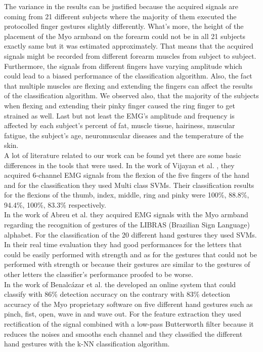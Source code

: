 The variance in the results can be justified because the acquired signals are coming from 21 different subjects where the majority of them executed the protocolled finger gestures slightly differently. What's more, the height of the placement of the Myo armband on the forearm could not be in all 21 subjects exactly same but it was estimated approximately. That means that the acquired signals might be recorded from different forearm muscles from subject to subject.  Furthermore, the signals from different fingers have varying amplitude which could lead to a biased performance of the classification algorithm. Also, the fact that multiple muscles are flexing and extending the fingers can affect the results of the classification algorithm. We observed also, that  the majority of the subjects when flexing and extending their pinky finger caused the ring finger to get strained as well. Last but not least the EMG's amplitude and frequency is affected by each subject's percent of fat, muscle tissue, hairiness, muscular fatigue, the subject's age, neuromuscular diseases and the temperature of the skin. \\
A lot of literature related to our work can be found yet there are some basic differences in the tools that were used. In the work of Vijayan et al. \cite{vijayan_surface_2015}, they acquired 6-channel EMG signals from the flexion of the five fingers of the hand and for the classification they used Multi class SVMs. Their classification results for the flexions of the thumb, index, middle, ring and pinky were 100\%, 88.8\%, 94.4\%, 100\%, 83.3\% respectively. \\
In the work of Abreu et al. \cite{abreu_evaluating_2016} they acquired EMG signals with the Myo armband regarding the recognition of gestures of the LIBRAS (Brazilian Sign Language) alphabet. For the classification of the 20 different hand gestures they used SVMs. In their real time evaluation they had good performances for the letters that could be easily performed with strength and as for the gestures that could not be performed with strength or because their gestures are similar to the gestures of other letters the classifier's performance proofed to be worse.\\
In the work of Benalcázar et al. \cite{benalcazar_hand_2017} the developed an online system that could classify with 86\% detection accuracy on the contrary with 83\% detection accuracy of the Myo proprietary software on five different hand gestures such as pinch, fist, open, wave in and wave out. For the feature extraction they used rectification of the signal combined with a low-pass Butterworth filter because it reduces the noises and smooths each channel and  they classified the different hand gestures with the k-NN classification algorithm.\\
